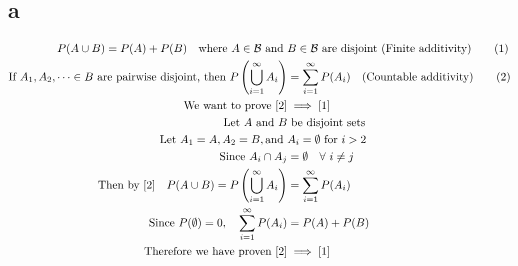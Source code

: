 \documentclass{article}
\begin{document}
\begin{flushleft}
\subsection*{a}
\begin{align*}
P(A\cup B)=P(A)+P(B) \quad \text{where } A\in \mathcal{B} \text{ and }& B  \in \mathcal{B} \text{ are disjoint } \text{(Finite additivity)} \label{1} \tag{1}\\
\text{If } A_1,A_2,\dots \in B \text{ are pairwise disjoint, then } P\left(\bigcup_{i=1}^{\infty}A_i \right)&=\sum \limits_{i=1}^{\infty}P(A_i) \quad \text{(Countable additivity)} \label{2} \tag{2}\\
\text{We want to prove } \eqref{2} &\implies \eqref{1}\\
\text{Let } A \text{ and } B& \text{ be disjoint sets}\\
\text{Let }A_1=A, A_2=B, \text{and }& A_i=\emptyset \text{ for } i>2\\
\text{Since } A_i \cap A_j &= \emptyset \quad \forall \ i \neq j\\ 
\text{Then by } \eqref{2} \quad P(A \cup B)=P\left(\bigcup_{i=1}^{\infty}A_i\right) &=\sum \limits_{i=1}^{\infty}P(A_i)\\
\text{Since } P(\emptyset)=0, \quad \sum \limits_{i=1}^{\infty}P(A_i)&=P(A)+P(B)\\
\text{Therefore we have proven } \eqref{2} &\implies \eqref{1}
\end{align*}

\end{flushleft}
\end{document}
